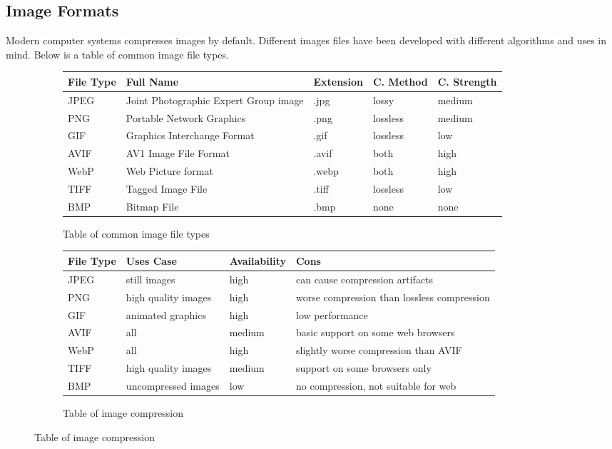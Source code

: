 \documentclass{article}
\begin{document}
\subsection{Image Formats}
Modern computer systems compresses images by default.
Different images files have been developed with different algorithms and uses in mind.
Below is a table of common image file types.

\begin{figure}[h]
\begin{subfigure}{\textwidth}
\begin{tabular}{l l l l l}
\toprule
File Type & Full Name                             & Extension & C. Method & C. Strength \\
\midrule
JPEG      & Joint Photographic Expert Group image & .jpg      & lossy     & medium \\
PNG       & Portable Network Graphics             & .png      & lossless  & medium \\
GIF       & Graphics Interchange Format           & .gif      & lossless  & low \\
AVIF      & AV1 Image File Format                 & .avif     & both      & high \\
WebP      & Web Picture format                    & .webp     & both      & high \\
TIFF      & Tagged Image File                     & .tiff     & lossless  & low \\
BMP       & Bitmap File                           & .bmp      & none      & none \\
\bottomrule
\end{tabular}
\caption{Table of common image file types}
\end{subfigure}

\begin{subfigure}{\textwidth}
\centering
\begin{tabular}{l l l l}
\toprule
File Type & Uses Case           & Availability & Cons \\
\midrule
JPEG      & still images        & high         & can cause compression artifacts              \\
PNG       & high quality images & high         & worse compression than lossless compression  \\
GIF       & animated graphics   & high         & low performance                              \\
AVIF      & all                 & medium       & basic support on some web browsers           \\
WebP      & all                 & high         & slightly worse compression than AVIF         \\
TIFF      & high quality images & medium       & support on some browsers only                \\
BMP       & uncompressed images & low          & no compression, not suitable for web         \\
\bottomrule
\end{tabular}
\caption{Table of image compression}
\end{subfigure}
\end{figure}
\end{document}
